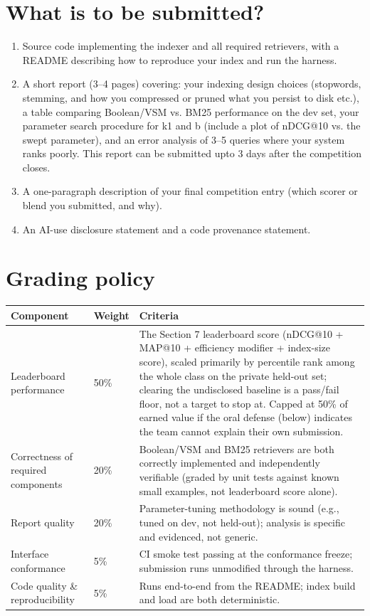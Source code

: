 \documentclass[10pt]{article}
\begin{document}
\section{What is to be submitted?}
\begin{enumerate}
\item Source code implementing the indexer and all required retrievers, with a README describing how to reproduce your index and run the harness.
\item A short report (3–4 pages) covering: your indexing design choices (stopwords, stemming, and how you compressed or pruned what you persist to disk etc.), a table comparing Boolean/VSM vs. BM25 performance on the dev set, your parameter search procedure for k1 and b (include a plot of nDCG@10 vs. the swept parameter), and an error analysis of 3–5 queries where your system ranks poorly. This report can be submitted upto 3 days after the competition closes.
\item A one-paragraph description of your final competition entry (which scorer or blend you submitted, and why).
\item An AI-use disclosure statement and a code provenance statement.
\end{enumerate}


\section{Grading policy}
\begin{center}
\begin{tabular}{|p{3.5cm}|l|p{10cm}|} 
\hline	
\textbf{Component} &	Weight &	Criteria \\
\hline
\hline
Leaderboard performance	& 50\%	& The Section 7 leaderboard score (nDCG@10 + MAP@10 + efficiency modifier + index-size score), scaled primarily by percentile rank among the whole class on the private held-out set; clearing the undisclosed baseline is a pass/fail floor, not a target to stop at. Capped at 50\% of earned value if the oral defense (below) indicates the team cannot explain their own submission.\\
\hline
Correctness of required components	& 20\%	& Boolean/VSM and BM25 retrievers are both correctly implemented and independently verifiable (graded by unit tests against known small examples, not leaderboard score alone). \\
\hline
Report quality	& 20\%	& Parameter-tuning methodology is sound (e.g., tuned on dev, not held-out); analysis is specific and evidenced, not generic. \\
\hline
Interface conformance	& 5\%	& CI smoke test passing at the conformance freeze; submission runs unmodified through the harness.\\
\hline
Code quality \& reproducibility	& 5\%	& Runs end-to-end from the README; index build and load are both deterministic.\\
\hline

\end{tabular}
\end{center}
\end{document}
